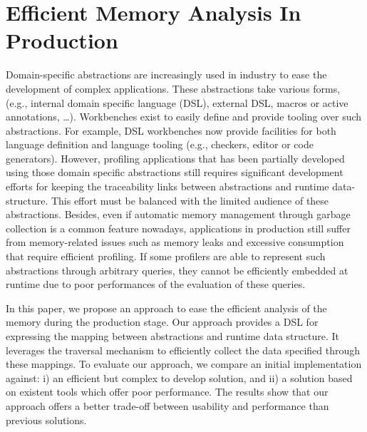 \chapter{Efficient Memory Analysis In Production}

Domain-specific abstractions are increasingly used in industry to ease the development of complex applications. These abstractions take various forms, (e.g., internal domain specific language (DSL), external DSL, macros or active annotations, \dots). Workbenches exist to easily define and provide tooling over such abstractions. For example, DSL workbenches now provide facilities for both language definition and language tooling (e.g., checkers, editor or code generators). 
However, profiling applications that has been partially developed using those domain specific abstractions still requires significant development efforts for keeping the traceability links between abstractions and runtime data-structure. This effort must be balanced with the limited audience of these abstractions. Besides, even if automatic memory management through garbage collection is a common feature nowadays, applications in production still suffer from memory-related issues such as memory leaks and excessive consumption that require efficient profiling.  If some profilers are able to represent such abstractions through arbitrary queries, they cannot be efficiently embedded at runtime due to poor performances of the evaluation of these queries.  

In this paper, we propose an approach to ease the efficient analysis of the memory during the production stage. Our approach provides a DSL for expressing the mapping between abstractions and runtime data structure.
It leverages the traversal mechanism to efficiently collect the data specified through these mappings.   
To evaluate our approach, we compare an initial implementation against: i) an efficient but complex to develop solution, and ii) a solution based on existent tools which offer poor performance. The results show that our approach offers a better trade-off between usability and performance than previous solutions.





%



